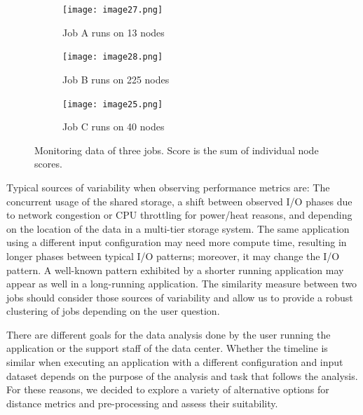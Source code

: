 \documentclass{jhps}
\begin{document}
\begin{figure}
        \centering
         \begin{subfigure}[t]{\textwidth}
           \texttt{[image: image27.png]}
           \caption{Job A runs on 13 nodes}
           \label{fig:typ_io:1}
         \end{subfigure}

        \begin{subfigure}[t]{\textwidth}
           \texttt{[image: image28.png]}
           \caption{Job B runs on 225 nodes}
           \label{fig:typ_io:2}
         \end{subfigure}

        \begin{subfigure}[t]{\textwidth}
          \texttt{[image: image25.png]}
          \caption{Job C runs on 40 nodes}
          \label{fig:typ_io:3}
        \end{subfigure}
\caption{Monitoring data of three jobs.
Score is the sum of individual node scores.}
         \label{fig:typ_io:all}
\end{figure}

Typical sources of variability when observing performance metrics are: The concurrent usage of the shared storage, a shift between observed I/O phases due to network congestion or CPU throttling for power/heat reasons, and depending on the location of the data in a multi-tier storage system.
The same application using a different input configuration may need more compute time, resulting in longer phases between typical I/O patterns; moreover, it may change the I/O pattern.
A well-known pattern exhibited by a shorter running application may appear as well in a long-running application.
The similarity measure between two jobs should consider those sources of variability and allow us to provide a robust clustering of jobs depending on the user question.

There are different goals for the data analysis done by the user running the application or the support staff of the data center.
Whether the timeline is similar when executing an application with a different configuration and input dataset depends on the purpose of the analysis and task that follows the analysis.
For these reasons, we decided to explore a variety of alternative options for distance metrics and pre-processing and assess their suitability.
\end{document}
